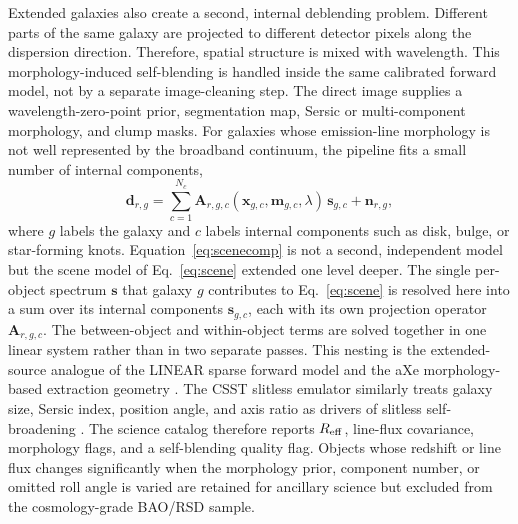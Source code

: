 \documentclass[10pt,onecolumn]{article}
\begin{document}
Extended galaxies also create a second, internal deblending problem. Different parts of the same galaxy are projected to different detector pixels along the dispersion direction. Therefore, spatial structure is mixed with wavelength. This morphology-induced self-blending is handled inside the same calibrated forward model, not by a separate image-cleaning step. The direct image supplies a wavelength-zero-point prior, segmentation map, Sersic or multi-component morphology, and clump masks. For galaxies whose emission-line morphology is not well represented by the broadband continuum, the pipeline fits a small number of internal components,
\begin{equation}
  \mathbf{d}_{r,g} =
  \sum_{c=1}^{N_c}
  \mathbf{A}_{r,g,c}(\mathbf{x}_{g,c},\mathbf{m}_{g,c},\lambda)\,
  \mathbf{s}_{g,c}
  +\mathbf{n}_{r,g},
  \label{eq:scenecomp}
\end{equation}
where $g$ labels the galaxy and $c$ labels internal components such as disk, bulge, or star-forming knots. Equation~\eqref{eq:scenecomp} is not a second, independent model but the scene model of Eq.~\eqref{eq:scene} extended one level deeper. The single per-object spectrum $\mathbf{s}$ that galaxy $g$ contributes to Eq.~\eqref{eq:scene} is resolved here into a sum over its internal components $\mathbf{s}_{g,c}$, each with its own projection operator $\mathbf{A}_{r,g,c}$. The between-object and within-object terms are solved together in one linear system rather than in two separate passes. This nesting is the extended-source analogue of the LINEAR sparse forward model and the aXe morphology-based extraction geometry \cite{axe2009,linear2018}. The CSST slitless emulator similarly treats galaxy size, Sersic index, position angle, and axis ratio as drivers of slitless self-broadening \cite{cess2024}. The science catalog therefore reports $R_{\rm eff}$, line-flux covariance, morphology flags, and a self-blending quality flag. Objects whose redshift or line flux changes significantly when the morphology prior, component number, or omitted roll angle is varied are retained for ancillary science but excluded from the cosmology-grade BAO/RSD sample.
\end{document}

